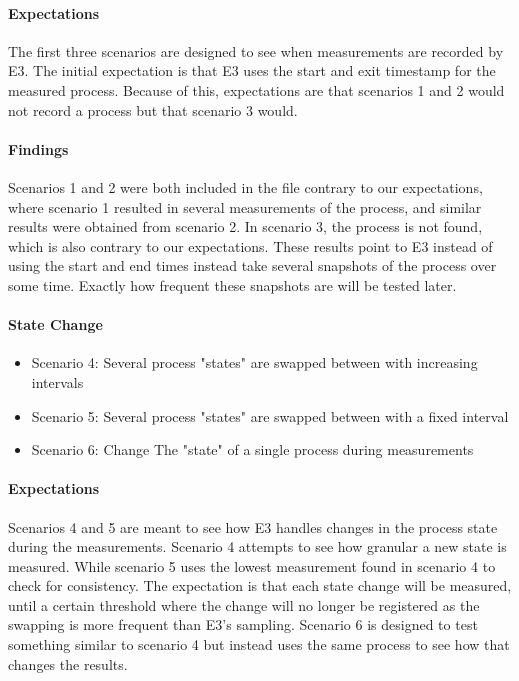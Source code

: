 \paragraph {Expectations}
The first three scenarios are designed to see when measurements are recorded by E3. The initial expectation is that E3 uses the start and exit timestamp for the measured process. Because of this, expectations are that scenarios 1 and 2 would not record a process but that scenario 3 would.

\paragraph{Findings}
Scenarios 1 and 2 were both included in the file contrary to our expectations, where scenario 1 resulted in several measurements of the process, and similar results were obtained from scenario 2. In scenario 3, the process is not found, which is also contrary to our expectations. These results point to E3 instead of using the start and end times instead take several snapshots of the process over some time. Exactly how frequent these snapshots are will be tested later. 

\paragraph{State Change}

\begin{itemize}
    \item Scenario 4: Several process "states" are swapped between with increasing intervals
    \item Scenario 5: Several process "states" are swapped between with a fixed interval
    \item Scenario 6: Change The "state" of a single process during measurements
\end{itemize}

\paragraph{Expectations}
Scenarios 4 and 5 are meant to see how E3 handles changes in the process state during the measurements. Scenario 4 attempts to see how granular a new state is measured. While scenario 5 uses the lowest measurement found in scenario 4 to check for consistency. The expectation is that each state change will be measured, until a certain threshold where the change will no longer be registered as the swapping is more frequent than E3's sampling. Scenario 6 is designed to test something similar to scenario 4 but instead uses the same process to see how that changes the results.
